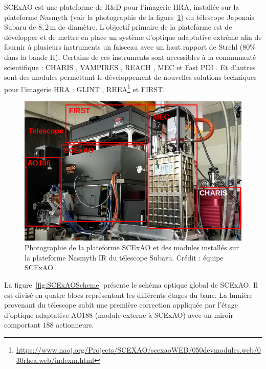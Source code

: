 \acrfull{SCExAO} \citep{jovanovic2015} est une plateforme de R\&D pour l'imagerie \ac{HRA}, installée sur la plateforme Nasmyth (voir la photographie de la figure~\ref{fig:SCExAOPhoto}) du télescope Japonais Subaru de $8,2 \,$m de diamètre. L'objectif primaire de la plateforme est de développer et de mettre en place un système d'optique adaptative extrême afin de fournir à plusieurs instruments un faisceau avec un haut rapport de Strehl ($80 \%$ dans la bande H). Certains de ces instruments sont accessibles à la communauté scientifique : \acrfull{CHARIS} \citep{groff2015}, \acrfull{VAMPIRES} \citep{norris2015}, \ac{REACH} \citep{kotani2018}, \ac{MEC} \citep{walter2020} et Fast \ac{PDI} \citep{lozi2020}. Et d'autres sont des modules permettant le développement de nouvelles solutions techniques pour l'imagerie \ac{HRA} : \ac{GLINT} \citep{norris2020b}, \ac{RHEA}\footnote{\url{https://www.naoj.org/Projects/SCEXAO/scexaoWEB/050devmodules.web/030rhea.web/indexm.html}} et \ac{FIRST}.

\begin{figure}[ht!]
    \centering
    \includegraphics[width=\figwidth]{Figure_Chap5/SCExAO_onNasIR_label.png}
    \caption[Photographie de la plateforme SCExAO et des modules installés sur la plateforme Nasmyth IR du télescope Subaru.]{Photographie de la plateforme SCExAO et des modules installés sur la plateforme Nasmyth IR du télescope Subaru. Crédit : équipe SCExAO.}
    \label{fig:SCExAOPhoto}
\end{figure}

La figure~\ref{fig:SCExAOScheme} présente le schéma optique global de \ac{SCExAO}. Il est divisé en quatre blocs représentant les différents étages du banc. La lumière provenant du télescope subit une première correction appliquée par l'étage d'optique adaptative AO188 \citep{minowa2010} (module externe à \ac{SCExAO}) avec un miroir comportant $188$ actionneurs.

